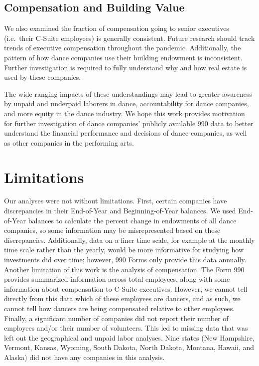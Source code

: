 \documentclass[Dance Data
Project,article,submit,moreauthors,pdftex]{mdpi}
\begin{document}
\hypertarget{compensation-and-building-value}{%
\subsection{Compensation and Building
Value}\label{compensation-and-building-value}}

We also examined the fraction of compensation going to senior executives
(i.e.~their C-Suite employees) is generally consistent. Future research
should track trends of executive compensation throughout the pandemic.
Additionally, the pattern of how dance companies use their building
endowment is inconsistent. Further investigation is required to fully
understand why and how real estate is used by these companies.

The wide-ranging impacts of these understandings may lead to greater
awareness by unpaid and underpaid laborers in dance, accountability for
dance companies, and more equity in the dance industry. We hope this
work provides motivation for further investigation of dance companies'
publicly available 990 data to better understand the financial
performance and decisions of dance companies, as well as other companies
in the performing arts.

\hypertarget{limitations}{%
\section{Limitations}\label{limitations}}

Our analyses were not without limitations. First, certain companies have
discrepancies in their End-of-Year and Beginning-of-Year balances. We
used End-of-Year balances to calculate the percent change in endowments
of all dance companies, so some information may be misrepresented based
on these discrepancies. Additionally, data on a finer time scale, for
example at the monthly time scale rather than the yearly, would be more
informative for studying how investments did over time; however, 990
Forms only provide this data annually. Another limitation of this work
is the analysis of compensation. The Form 990 provides summarized
information across total employees, along with some information about
compensation to C-Suite executives. However, we cannot tell directly
from this data which of these employees are dancers, and as such, we
cannot tell how dancers are being compensated relative to other
employees. Finally, a significant number of companies did not report
their number of employees and/or their number of volunteers. This led to
missing data that was left out the geographical and unpaid labor
analyses. Nine states (New Hampshire, Vermont, Kansas, Wyoming, South
Dakota, North Dakota, Montana, Hawaii, and Alaska) did not have any
companies in this analysis.
\end{document}
